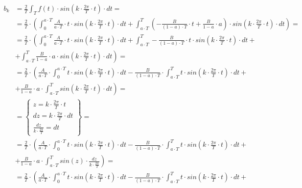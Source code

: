 \begin{task}
\begin{align*}
b_k&=\frac{2}{T}\int_{T}f(t) \cdot sin\left( k \cdot \frac{2\pi}{T} \cdot t\right) \cdot dt=\\
&=\frac{2}{T}\cdot\left(\int_{0}^{a\cdot T} \frac{A}{a \cdot T} \cdot t \cdot sin\left( k \cdot \frac{2\pi}{T} \cdot t\right) \cdot dt+\int_{a \cdot T}^{T} \left(-\frac{B}{\left(1-a\right)\cdot T}\cdot t + \frac{B}{1-a}\cdot a\right) \cdot sin\left( k \cdot \frac{2\pi}{T} \cdot t\right) \cdot dt\right)=\\
&=\frac{2}{T}\cdot\left(\int_{0}^{a\cdot T} \frac{A}{a \cdot T} \cdot t \cdot sin\left( k \cdot \frac{2\pi}{T} \cdot t\right) \cdot dt+\int_{a \cdot T}^{T} -\frac{B}{\left(1-a\right)\cdot T}\cdot t \cdot sin\left( k \cdot \frac{2\pi}{T} \cdot t\right) \cdot dt \right. +\\
&+\left. \int_{a \cdot T}^{T} \frac{B}{1-a}\cdot a \cdot sin\left( k \cdot \frac{2\pi}{T} \cdot t\right) \cdot dt\right)=\\
&=\frac{2}{T}\cdot\left( \frac{A}{a \cdot T} \cdot \int_{0}^{a\cdot T} t \cdot sin\left( k \cdot \frac{2\pi}{T} \cdot t\right) \cdot dt -\frac{B}{\left(1-a\right)\cdot T}\cdot \int_{a \cdot T}^{T} t \cdot sin\left( k \cdot \frac{2\pi}{T} \cdot t\right) \cdot dt \right. +\\
&+\left. \frac{B}{1-a}\cdot a \cdot \int_{a \cdot T}^{T} sin\left( k \cdot \frac{2\pi}{T} \cdot t\right) \cdot dt\right)=\\
&=\left\{\begin{array}{l}
z = k \cdot \frac{2\pi}{T} \cdot t \\
dz = k \cdot \frac{2\pi}{T} \cdot dt \\
\frac{dz}{k \cdot \frac{2\pi}{T}} = dt
\end{array}\right\}=\\
&=\frac{2}{T}\cdot\left( \frac{A}{a \cdot T} \cdot \int_{0}^{a\cdot T} t \cdot sin\left( k \cdot \frac{2\pi}{T} \cdot t\right) \cdot dt -\frac{B}{\left(1-a\right)\cdot T}\cdot \int_{a \cdot T}^{T} t \cdot sin\left( k \cdot \frac{2\pi}{T} \cdot t\right) \cdot dt \right. +\\
&+\left. \frac{B}{1-a}\cdot a \cdot \int_{a \cdot T}^{T} sin\left(z\right) \cdot \frac{dz}{k \cdot \frac{2\pi}{T}}\right)=\\
&=\frac{2}{T}\cdot\left( \frac{A}{a \cdot T} \cdot \int_{0}^{a\cdot T} t \cdot sin\left( k \cdot \frac{2\pi}{T} \cdot t\right) \cdot dt -\frac{B}{\left(1-a\right)\cdot T}\cdot \int_{a \cdot T}^{T} t \cdot sin\left( k \cdot \frac{2\pi}{T} \cdot t\right) \cdot dt \right. +\\

\end{align*}
\end{task}
